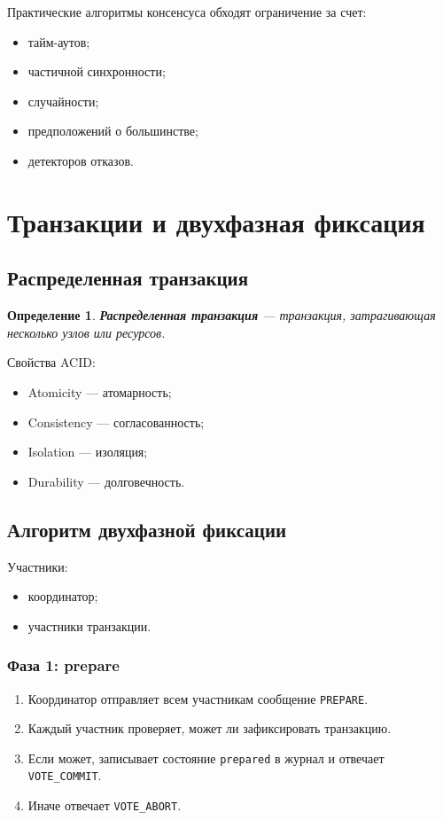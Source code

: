 \documentclass[12pt,a4paper]{article}
\newtheorem{definition}{Определение}
\begin{document}
Практические алгоритмы консенсуса обходят ограничение за счет:
\begin{itemize}
    \item тайм-аутов;
    \item частичной синхронности;
    \item случайности;
    \item предположений о большинстве;
    \item детекторов отказов.
\end{itemize}

\section{Транзакции и двухфазная фиксация}

\subsection{Распределенная транзакция}

\begin{definition}
\textbf{Распределенная транзакция} --- транзакция, затрагивающая несколько узлов или ресурсов.
\end{definition}

Свойства ACID:
\begin{itemize}
    \item Atomicity --- атомарность;
    \item Consistency --- согласованность;
    \item Isolation --- изоляция;
    \item Durability --- долговечность.
\end{itemize}

\subsection{Алгоритм двухфазной фиксации}

Участники:
\begin{itemize}
    \item координатор;
    \item участники транзакции.
\end{itemize}

\subsubsection{Фаза 1: prepare}

\begin{enumerate}
    \item Координатор отправляет всем участникам сообщение \texttt{PREPARE}.
    \item Каждый участник проверяет, может ли зафиксировать транзакцию.
    \item Если может, записывает состояние \texttt{prepared} в журнал и отвечает \texttt{VOTE\_COMMIT}.
    \item Иначе отвечает \texttt{VOTE\_ABORT}.
\end{enumerate}
\end{document}
